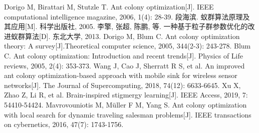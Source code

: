 \documentclass[10pt,a4paper,twocolumn,twoside,UTF8]{ctexart}
\begin{document}
	\begin{thebibliography}{99}  
		 Dorigo M, Birattari M, Stutzle T. Ant colony optimization[J]. IEEE computational intelligence magazine, 2006, 1(4): 28-39.
		段海滨. 蚁群算法原理及其应用[M]. 科学出版社, 2005. 
		李擎, 张超, 陈鹏, 等. 一种基于粒子群参数优化的改进蚁群算法[D]. 东北大学, 2013. 
		Dorigo M, Blum C. Ant colony optimization theory: A survey[J].Theoretical computer science, 2005, 344(2-3): 243-278.
		Blum C. Ant colony optimization: Introduction and recent trends[J]. Physics of Life reviews, 2005, 2(4): 353-373.
		Wang J, Cao J, Sherratt R S, et al. An improved ant colony optimization-based approach with mobile sink for wireless sensor networks[J]. The Journal of Supercomputing, 2018, 74(12): 6633-6645.
		Xu X, Zhao Z, Li R, et al. Brain-inspired stigmergy learning[J]. IEEE Access, 2019, 7: 54410-54424.
		Mavrovouniotis M, Müller F M, Yang S. Ant colony optimization with local search for dynamic traveling salesman problems[J]. IEEE transactions on cybernetics, 2016, 47(7): 1743-1756.
	\end{thebibliography}
\end{document}

